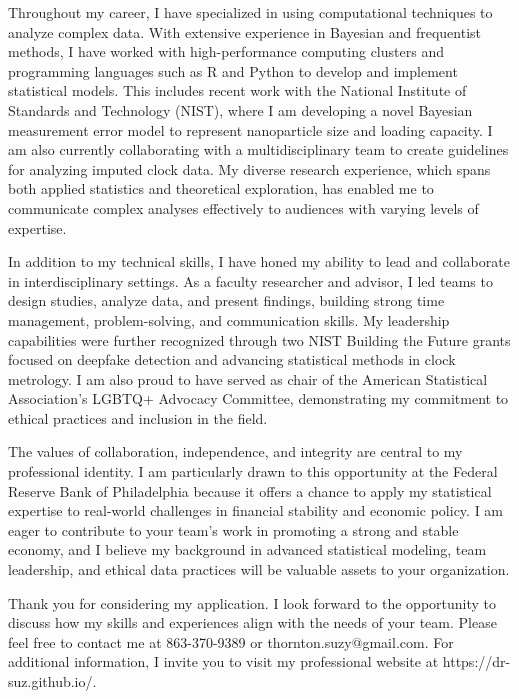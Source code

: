 \documentclass[11pt,a4paper,sans]{moderncv}
\begin{document}
Throughout my career, I have specialized in using computational techniques to analyze complex data. With extensive experience in Bayesian and frequentist methods, I have worked with high-performance computing clusters and programming languages such as R and Python to develop and implement statistical models. This includes recent work with the National Institute of Standards and Technology (NIST), where I am developing a novel Bayesian measurement error model to represent nanoparticle size and loading capacity. I am also currently collaborating with a multidisciplinary team to create guidelines for analyzing imputed clock data. My diverse research experience, which spans both applied statistics and theoretical exploration, has enabled me to communicate complex analyses effectively to audiences with varying levels of expertise.

In addition to my technical skills, I have honed my ability to lead and collaborate in interdisciplinary settings. As a faculty researcher and advisor, I led teams to design studies, analyze data, and present findings, building strong time management, problem-solving, and communication skills. My leadership capabilities were further recognized through two NIST Building the Future grants focused on deepfake detection and advancing statistical methods in clock metrology. I am also proud to have served as chair of the American Statistical Association’s LGBTQ+ Advocacy Committee, demonstrating my commitment to ethical practices and inclusion in the field.

The values of collaboration, independence, and integrity are central to my professional identity. I am particularly drawn to this opportunity at the Federal Reserve Bank of Philadelphia because it offers a chance to apply my statistical expertise to real-world challenges in financial stability and economic policy. I am eager to contribute to your team’s work in promoting a strong and stable economy, and I believe my background in advanced statistical modeling, team leadership, and ethical data practices will be valuable assets to your organization.

Thank you for considering my application. I look forward to the opportunity to discuss how my skills and experiences align with the needs of your team. Please feel free to contact me at 863-370-9389 or thornton.suzy@gmail.com. For additional information, I invite you to visit my professional website at https://dr-suz.github.io/.
	
	\vspace{3mm}
	
	\makeletterclosing
	
\end{document}
